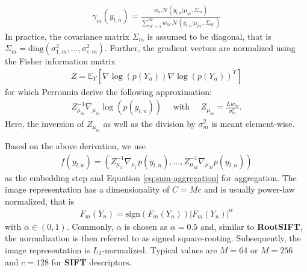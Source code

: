 \begin{align}
    \gamma_m(y_{l,n}) = \frac{w_m \mathcal{N}(y_{l,n} | \mu_m, \Sigma_m)}{\sum_{m' = 1}^M w_{m'} \mathcal{N}(y_{l,n} | \mu_{m'}, \Sigma_{m'})}
\end{align}
In practice, the covariance matrix $\Sigma_m$ is assumed to be diagonal, that is $\Sigma_m = \text{diag}(\sigma_{1,m}^2,\ldots,\sigma_{c,m}^2)$. Further, the gradient vectors are normalized using the Fisher information matrix
\begin{align}
	Z = \mathbb{E}_Y \left[\nabla \log(p(Y_n)) \nabla \log(p(Y_n))^T\right]
\end{align}
for which Perronnin \etal derive the following approximation:
\begin{align}
    Z_{\mu_m}^{-1} \nabla_{\mu_m} \log (p(y_{l,n})) \quad\text{ with }\quad Z_{\mu_m} = \frac{L w_m}{\sigma_m^2}.
\end{align}
Here, the inversion of $Z_{\mu_m}$ as well as the division by $\sigma_m^2$ is meant element-wise.

Based on the above derivation, we use
\begin{align}
    f(y_{l,n}) = \left(Z_{\mu_1}^{-1} \nabla_{\mu_1} p (y_{l,n}),\ldots,Z_{\mu_M}^{-1}  \nabla_{\mu_M} p (y_{l,n})\right)
\end{align}
as the embedding step and Equation \eqref{eq:sum-aggregation} for aggregation. The image representation has a dimensionality of $C = M c$ and is usually power-law normalized, that is
\begin{align}
    F_m(Y_n) = \text{sign}\left(F_m(Y_n)\right) \left|F_m(Y_n)\right|^\alpha
\end{align}
with $\alpha \in (0,1)$. Commonly, $\alpha$ is chosen as $\alpha = 0.5$ and, similar to \textbf{RootSIFT}, the normalization is then referred to as signed square-rooting. Subsequently, the image representation is $L_2$-normalized. Typical values are $M = 64$ or $M = 256$ and $c = 128$ for \textbf{SIFT} descriptors.

